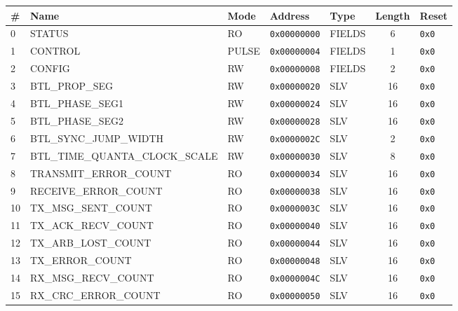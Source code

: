 \documentclass{article}
\begin{document}
\begin{table}[h!]
  \begin{center}
    \label{tab:table1}
    \begin{tabularx}{\linewidth}{|l|X|l|l|l|c|l|}
      \hline
      \textbf{\#} & \textbf{Name} & \textbf{Mode} & \textbf{Address} & \textbf{Type} & \textbf{Length} &
      \textbf{Reset} \\
      \hline
      0 & STATUS & RO & \texttt{0x00000000} & FIELDS & 6 & \texttt{0x0} \\
      \hline
      1 & CONTROL & PULSE & \texttt{0x00000004} & FIELDS & 1 & \texttt{0x0} \\
      \hline
      2 & CONFIG & RW & \texttt{0x00000008} & FIELDS & 2 & \texttt{0x0} \\
      \hline
      3 & BTL{\_}PROP{\_}SEG & RW & \texttt{0x00000020} & SLV & 16 & \texttt{0x0} \\
      \hline
      4 & BTL{\_}PHASE{\_}SEG1 & RW & \texttt{0x00000024} & SLV & 16 & \texttt{0x0} \\
      \hline
      5 & BTL{\_}PHASE{\_}SEG2 & RW & \texttt{0x00000028} & SLV & 16 & \texttt{0x0} \\
      \hline
      6 & BTL{\_}SYNC{\_}JUMP{\_}WIDTH & RW & \texttt{0x0000002C} & SLV & 2 & \texttt{0x0} \\
      \hline
      7 & BTL{\_}TIME{\_}QUANTA{\_}CLOCK{\_}SCALE & RW & \texttt{0x00000030} & SLV & 8 & \texttt{0x0} \\
      \hline
      8 & TRANSMIT{\_}ERROR{\_}COUNT & RO & \texttt{0x00000034} & SLV & 16 & \texttt{0x0} \\
      \hline
      9 & RECEIVE{\_}ERROR{\_}COUNT & RO & \texttt{0x00000038} & SLV & 16 & \texttt{0x0} \\
      \hline
      10 & TX{\_}MSG{\_}SENT{\_}COUNT & RO & \texttt{0x0000003C} & SLV & 16 & \texttt{0x0} \\
      \hline
      11 & TX{\_}ACK{\_}RECV{\_}COUNT & RO & \texttt{0x00000040} & SLV & 16 & \texttt{0x0} \\
      \hline
      12 & TX{\_}ARB{\_}LOST{\_}COUNT & RO & \texttt{0x00000044} & SLV & 16 & \texttt{0x0} \\
      \hline
      13 & TX{\_}ERROR{\_}COUNT & RO & \texttt{0x00000048} & SLV & 16 & \texttt{0x0} \\
      \hline
      14 & RX{\_}MSG{\_}RECV{\_}COUNT & RO & \texttt{0x0000004C} & SLV & 16 & \texttt{0x0} \\
      \hline
      15 & RX{\_}CRC{\_}ERROR{\_}COUNT & RO & \texttt{0x00000050} & SLV & 16 & \texttt{0x0} \\

\end{tabularx}
\end{center}
\end{table}
\end{document}
